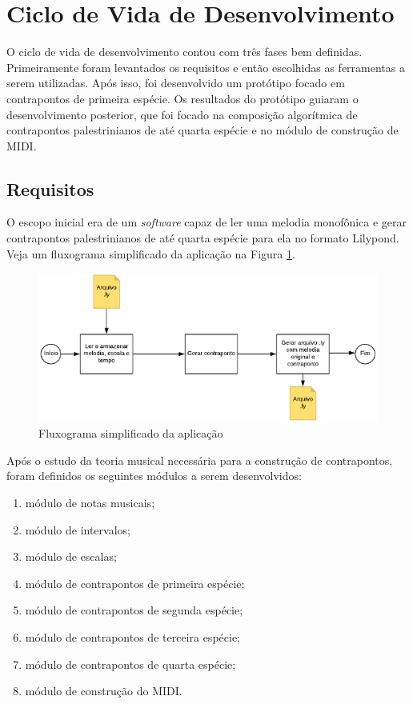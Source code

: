   \section[Ciclo de Vida de Desenvolvimento]{Ciclo de Vida de Desenvolvimento}

    O ciclo de vida de desenvolvimento contou com três fases bem definidas. Primeiramente foram levantados os requisitos e então escolhidas as ferramentas a serem utilizadas. Após isso, foi desenvolvido um protótipo focado em contrapontos de primeira espécie. Os resultados do protótipo guiaram o desenvolvimento posterior, que foi focado na composição algorítmica de contrapontos palestrinianos de até quarta espécie e no módulo de construção de MIDI\footnotemark {}.

  \subsection[Requisitos]{Requisitos} \label{sssec:req}

    O escopo inicial era de um \textit{software} capaz de ler uma melodia monofônica e gerar contrapontos palestrinianos de até quarta espécie para ela no formato Lilypond. Veja um fluxograma simplificado da aplicação na Figura \ref{fluxograma}.

    \begin{figure}[htb]
      \centering
      \includegraphics[scale=0.85]{figuras/fluxograma.eps}
      \caption{Fluxograma simplificado da aplicação}
      \label{fluxograma}
    \end{figure}


    Após o estudo da teoria musical necessária para a construção de contrapontos, foram definidos os seguintes módulos a serem desenvolvidos:

    \begin{enumerate}
      \item módulo de notas musicais;
      \item módulo de intervalos;
      \item módulo de escalas;
      \item módulo de contrapontos de primeira espécie;
      \item módulo de contrapontos de segunda espécie;
      \item módulo de contrapontos de terceira espécie;
      \item módulo de contrapontos de quarta espécie;
      \item módulo de construção do MIDI.
    \end{enumerate}

